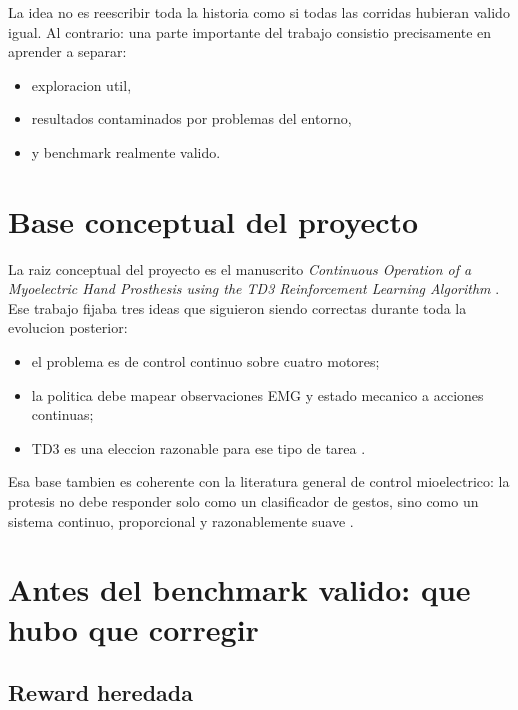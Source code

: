 \documentclass[11pt,a4paper]{article}
\begin{document}
La idea no es reescribir toda la historia como si todas las corridas hubieran valido igual. Al contrario: una parte importante del trabajo consistio precisamente en aprender a separar:
\begin{itemize}[leftmargin=1.5em]
\item exploracion util,
\item resultados contaminados por problemas del entorno,
\item y benchmark realmente valido.
\end{itemize}

\section{Base conceptual del proyecto}

La raiz conceptual del proyecto es el manuscrito \emph{Continuous Operation of a Myoelectric Hand Prosthesis using the TD3 Reinforcement Learning Algorithm} \citep{fuertes2026continuous}. Ese trabajo fijaba tres ideas que siguieron siendo correctas durante toda la evolucion posterior:
\begin{itemize}[leftmargin=1.5em]
\item el problema es de control continuo sobre cuatro motores;
\item la politica debe mapear observaciones EMG y estado mecanico a acciones continuas;
\item TD3 es una eleccion razonable para ese tipo de tarea \citep{fujimoto2018td3,mathworks_td3_agent,mathworks_td3_options}.
\end{itemize}

Esa base tambien es coherente con la literatura general de control mioelectrico: la protesis no debe responder solo como un clasificador de gestos, sino como un sistema continuo, proporcional y razonablemente suave \citep{chen2023review,done2025prostheticrl}.

\section{Antes del benchmark valido: que hubo que corregir}

\subsection{Reward heredada}
\end{document}

